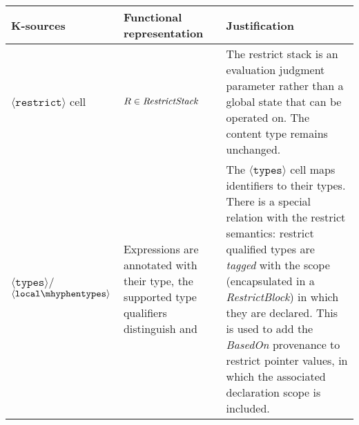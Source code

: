 \newpage

\begin{table}[H]
\centering
\noindent\begin{tabularx}{\textwidth}{ssX}
\textbf{K-sources}                              & \textbf{Functional representation} &  \textbf{Justification} \\
\hline
$\mathtt{\langle restrict \rangle}$ cell        & $R \in \textit{RestrictStack}$    & The restrict stack is an evaluation judgment parameter rather than a global state that can be operated on. The content type remains unchanged. \\
\hline
$\mathtt{\langle types \rangle} /$ $\mathtt{\langle local\mhyphen types \rangle}$    &    Expressions are annotated with their type, the supported type qualifiers distinguish  and                        & The $\mathtt{\langle types \rangle}$ cell maps
                identifiers to their types. There is a special relation with the restrict semantics: restrict qualified types are \textit{tagged} with the scope (encapsulated in a \textit{RestrictBlock}) in which they are declared.
                This is used to add the \textit{BasedOn} provenance to restrict pointer values, in which the associated declaration scope is included.


\end{tabularx}
\end{table}
